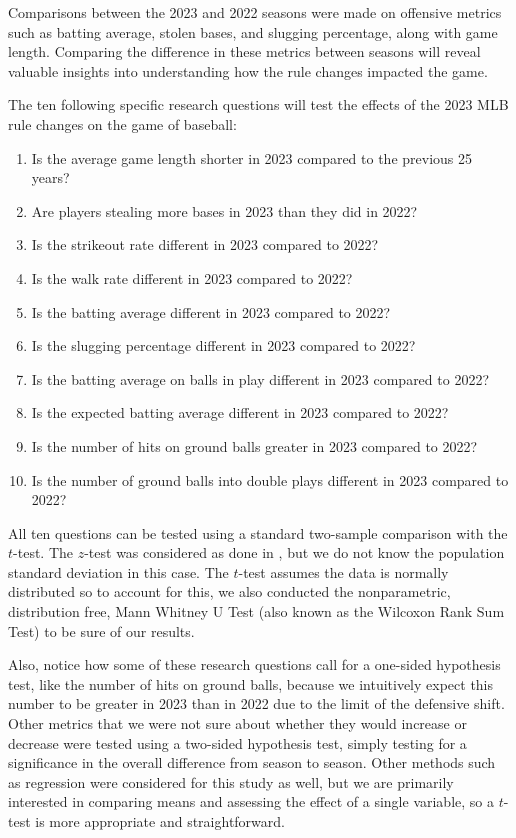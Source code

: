 \documentclass[12pt]{article}
\begin{document}
Comparisons between the 2023 and 2022 seasons were made on offensive metrics such
as batting average, stolen bases, and slugging percentage, along with game length.
Comparing the difference in these metrics between seasons will reveal valuable insights
into understanding how the rule changes impacted the game.

The ten following specific research questions will test the effects of the 2023
MLB rule changes on the game of baseball:

\begin{enumerate}
  \def\labelenumi{\arabic{enumi}.}
  \item
    Is the average game length shorter in 2023 compared to the previous 25 years?
  \item
    Are players stealing more bases in 2023 than they did in 2022?
  \item
    Is the strikeout rate different in 2023 compared to 2022?
  \item
    Is the walk rate different in 2023 compared to 2022?
  \item
    Is the batting average different in 2023 compared to 2022?
  \item
    Is the slugging percentage different in 2023 compared to 2022?
  \item
    Is the batting average on balls in play different in 2023 compared to 2022?
  \item 
    Is the expected batting average different in 2023 compared to 2022?
  \item
    Is the number of hits on ground balls greater in 2023 compared to 2022?
  \item
    Is the number of ground balls into double plays different in 2023 compared to 2022?
\end{enumerate}

All ten questions can be tested using a standard two-sample comparison with the \(t\)-test.
The \(z\)-test was considered as done in \citet{Price}, but we do not know the population standard deviation
in this case. The \(t\)-test assumes the data is normally distributed so to account
for this, we also conducted the nonparametric, distribution free, Mann Whitney U
Test (also known as the Wilcoxon Rank Sum Test) to be sure of our results. 

Also, notice how some of these research questions call for a one-sided hypothesis test,
like the number of hits on ground balls, because we intuitively expect this number
to be greater in 2023 than in 2022 due to the limit of the defensive shift. Other
metrics that we were not sure about whether they would increase or decrease were
tested using a two-sided hypothesis test, simply testing for a significance in the
overall difference from season to season. Other methods such as regression were
considered for this study as well, but we are primarily interested in comparing
means and assessing the effect of a single variable, so a \(t\)-test is more appropriate
and straightforward.
\end{document}
